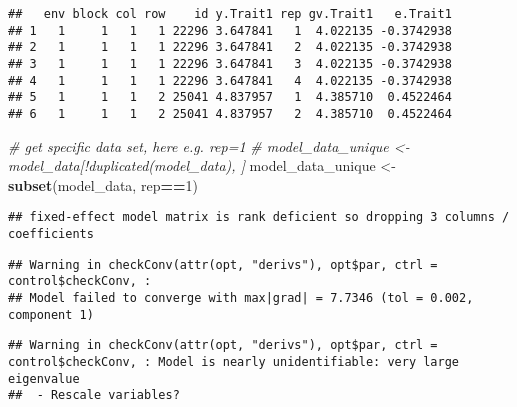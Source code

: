 \documentclass[
]{article}
\newenvironment{Shaded}{\begin{snugshade}}{\end{snugshade}}
\newcommand{\AttributeTok}[1]{\textcolor[rgb]{0.13,0.29,0.53}{#1}}
\newcommand{\CommentTok}[1]{\textcolor[rgb]{0.56,0.35,0.01}{\textit{#1}}}
\newcommand{\DecValTok}[1]{\textcolor[rgb]{0.00,0.00,0.81}{#1}}
\newcommand{\FunctionTok}[1]{\textcolor[rgb]{0.13,0.29,0.53}{\textbf{#1}}}
\newcommand{\NormalTok}[1]{#1}
\newcommand{\OtherTok}[1]{\textcolor[rgb]{0.56,0.35,0.01}{#1}}
\newcommand{\SpecialCharTok}[1]{\textcolor[rgb]{0.81,0.36,0.00}{\textbf{#1}}}
\begin{document}
\begin{verbatim}
##   env block col row    id y.Trait1 rep gv.Trait1   e.Trait1
## 1   1     1   1   1 22296 3.647841   1  4.022135 -0.3742938
## 2   1     1   1   1 22296 3.647841   2  4.022135 -0.3742938
## 3   1     1   1   1 22296 3.647841   3  4.022135 -0.3742938
## 4   1     1   1   1 22296 3.647841   4  4.022135 -0.3742938
## 5   1     1   1   2 25041 4.837957   1  4.385710  0.4522464
## 6   1     1   1   2 25041 4.837957   2  4.385710  0.4522464
\end{verbatim}

\begin{Shaded}
\begin{Highlighting}[]
\CommentTok{\# get specific data set, here e.g. rep=1}
\CommentTok{\# model\_data\_unique \textless{}{-} model\_data[!duplicated(model\_data), ]}
\NormalTok{model\_data\_unique }\OtherTok{\textless{}{-}} \FunctionTok{subset}\NormalTok{(model\_data, rep}\SpecialCharTok{==}\DecValTok{1}\NormalTok{)}
\end{Highlighting}
\end{Shaded}

\begin{Shaded}
\end{Shaded}

\begin{verbatim}
## fixed-effect model matrix is rank deficient so dropping 3 columns / coefficients
\end{verbatim}

\begin{verbatim}
## Warning in checkConv(attr(opt, "derivs"), opt$par, ctrl = control$checkConv, :
## Model failed to converge with max|grad| = 7.7346 (tol = 0.002, component 1)
\end{verbatim}

\begin{verbatim}
## Warning in checkConv(attr(opt, "derivs"), opt$par, ctrl = control$checkConv, : Model is nearly unidentifiable: very large eigenvalue
##  - Rescale variables?
\end{verbatim}
\end{document}

